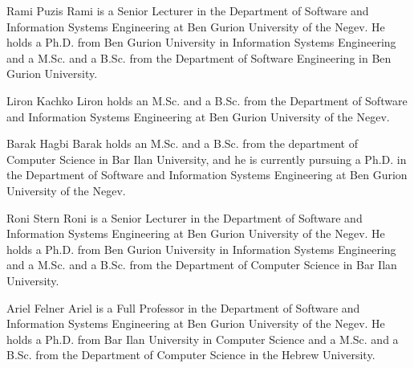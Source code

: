 \documentclass[journal]{IEEEtran}
\begin{document}


%


% 


\begin{IEEEbiographynophoto}{Rami Puzis}
Rami is a Senior Lecturer in the Department of Software and Information Systems Engineering at Ben Gurion University of the Negev.
He holds a Ph.D. from Ben Gurion University in Information Systems Engineering and a M.Sc. and a B.Sc. from the Department of Software Engineering in Ben Gurion University.
\end{IEEEbiographynophoto}

\begin{IEEEbiographynophoto}{Liron Kachko}
Liron holds an M.Sc. and a B.Sc. from the Department of Software and Information Systems Engineering at Ben Gurion University of the Negev.
\end{IEEEbiographynophoto}


\begin{IEEEbiographynophoto}{Barak Hagbi}
Barak holds an M.Sc. and a B.Sc. from the department of Computer Science in Bar Ilan University, and he is currently pursuing a Ph.D. in the Department of Software and Information Systems Engineering at Ben Gurion University of the Negev.
\end{IEEEbiographynophoto}


\begin{IEEEbiographynophoto}{Roni Stern}
Roni is a Senior Lecturer in the Department of Software and Information Systems Engineering at Ben Gurion University of the Negev.
He holds a Ph.D. from Ben Gurion University in Information Systems Engineering and a M.Sc. and a B.Sc. from the Department of Computer Science in Bar Ilan University.
\end{IEEEbiographynophoto}


\begin{IEEEbiographynophoto}{Ariel Felner}
Ariel is a Full Professor in the Department of Software and Information Systems Engineering at Ben Gurion University of the Negev.
He holds a Ph.D. from Bar Ilan University in Computer Science and a M.Sc. and a B.Sc. from the Department of Computer Science in the Hebrew University.
\end{IEEEbiographynophoto}


\end{document}
